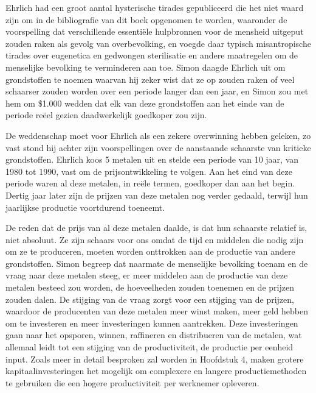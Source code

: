 Ehrlich had een groot aantal hysterische tirades gepubliceerd die het
niet waard zijn om in de bibliografie van dit boek opgenomen te worden,
waaronder de voorspelling dat verschillende essentiële hulpbronnen voor
de mensheid uitgeput zouden raken als gevolg van overbevolking, en
voegde daar typisch misantropische tirades over eugenetica en gedwongen
sterilisatie en andere maatregelen om de menselijke bevolking te
verminderen aan toe. Simon daagde Ehrlich uit om grondstoffen te noemen
waarvan hij zeker wist dat ze op zouden raken of veel schaarser zouden
worden over een periode langer dan een jaar, en Simon zou met hem om
\$1.000 wedden dat elk van deze grondstoffen aan het einde van de
periode reëel gezien daadwerkelijk goedkoper zou zijn.

De weddenschap moet voor Ehrlich als een zekere overwinning hebben geleken, zo vast stond hij achter zijn voorspellingen over de aanstaande schaarste van kritieke grondstoffen. Ehrlich koos 5 metalen uit en stelde een periode van 10 jaar, van 1980 tot 1990, vast om de prijsontwikkeling te volgen. Aan het eind van deze periode waren al deze metalen, in reële termen, goedkoper dan aan het begin. Dertig jaar later zijn de prijzen van deze metalen nog verder gedaald, terwijl hun jaarlijkse productie voortdurend toeneemt.

De reden dat de prijs van al deze metalen daalde, is dat hun schaarste
relatief is, niet absoluut. Ze zijn schaars voor ons omdat de tijd en
middelen die nodig zijn om ze te produceren, moeten worden onttrokken
aan de productie van andere grondstoffen. Simon begreep dat naarmate de
menselijke bevolking toenam en de vraag naar deze metalen steeg, er meer
middelen aan de productie van deze metalen besteed zou worden, de
hoeveelheden zouden toenemen en de prijzen zouden dalen. De stijging van
de vraag zorgt voor een stijging van de prijzen, waardoor de producenten
van deze metalen meer winst maken, meer geld hebben om te investeren en
meer investeringen kunnen aantrekken. Deze investeringen gaan naar het
opsporen, winnen, raffineren en distribueren van de metalen, wat
allemaal leidt tot een stijging van de productiviteit, de productie per
eenheid input. Zoals meer in detail besproken zal worden in Hoofdstuk 4,
maken grotere kapitaalinvesteringen het mogelijk om complexere en
langere productiemethoden te gebruiken die een hogere productiviteit per
werknemer opleveren.

